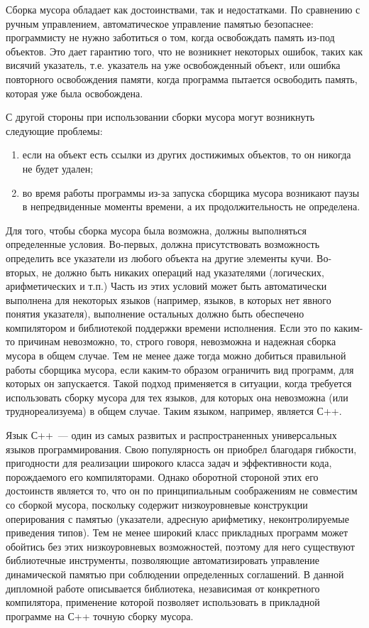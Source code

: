 Сборка мусора обладает как достоинствами, так и недостатками. По сравнению с ручным управлением, автоматическое 
управление памятью безопаснее: программисту не нужно заботиться о том, когда освобождать память из-под объектов. 
Это дает гарантию того, что не возникнет некоторых ошибок, таких как висячий указатель, т.е. указатель на уже 
освобожденный объект, или ошибка повторного освобождения памяти, когда программа пытается освободить память, 
которая уже была освобождена.

С другой стороны при использовании сборки мусора могут возникнуть следующие проблемы:

\begin{enumerate}
\item если на объект есть ссылки из других достижимых объектов, то он никогда не будет удален;
\item во время работы программы из-за запуска сборщика мусора возникают паузы в непредвиденные моменты времени, а их 
продолжительность не определена.
\end{enumerate}

Для того, чтобы сборка мусора была возможна, должны выполняться определенные условия. Во-первых, должна присутствовать 
возможность определить все указатели из любого объекта на другие элементы кучи. Во-вторых, не должно быть никаких 
операций над указателями (логических, арифметических и т.п.) Часть из этих условий может быть автоматически выполнена
для некоторых языков (например, языков, в которых нет явного понятия указателя), выполнение остальных должно быть
обеспечено компилятором и библиотекой поддержки времени исполнения. Если это по каким-то причинам невозможно, то, строго
говоря, невозможна и надежная сборка мусора в общем случае. Тем не менее даже тогда можно добиться правильной
работы сборщика мусора, если каким-то образом ограничить вид программ, для которых он запускается. Такой подход применяется 
в ситуации, когда требуется использовать сборку мусора для тех языков, для которых она невозможна (или труднореализуема) 
в общем случае. Таким языком, например, является С++.

Язык С++~--- один из самых развитых и распространенных универсальных языков программирования. Свою популярность он приобрел 
благодаря гибкости, пригодности для реализации широкого класса задач и эффективности кода, порождаемого его 
компиляторами. Однако оборотной стороной этих его достоинств является то, что он по принципиальным соображениям не 
совместим со сборкой мусора, поскольку содержит низкоуровневые конструкции оперирования с памятью (указатели, адресную 
арифметику, неконтролируемые приведения типов). Тем не менее широкий класс прикладных программ может обойтись без этих
низкоуровневых возможностей, поэтому для него существуют библиотечные инструменты, позволяющие автоматизировать
управление динамической памятью при соблюдении определенных соглашений. В данной дипломной работе описывается
библиотека, независимая от конкретного компилятора, применение которой позволяет использовать в прикладной
программе на С++ точную сборку мусора.
